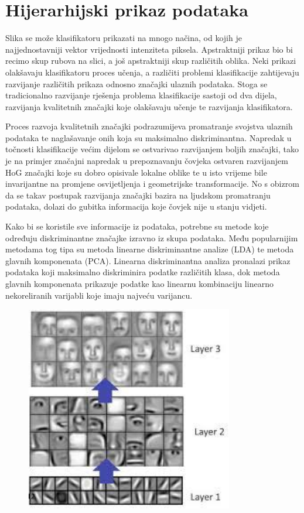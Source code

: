 \documentclass[lmodern, utf8, diplomski, numeric]{fer}
\begin{document}
\section{Hijerarhijski prikaz podataka}

Slika se može klasifikatoru prikazati na mnogo načina, od kojih je najjednostavniji vektor vrijednosti intenziteta piksela. Apstraktniji prikaz bio bi recimo skup rubova na slici, a još apstraktniji skup različitih oblika. Neki prikazi olakšavaju klasifikatoru proces učenja, a različiti problemi klasifikacije zahtijevaju razvijanje različitih prikaza odnosno značajki ulaznih podataka. Stoga  se tradicionalno razvijanje rješenja problema klasifikacije sastoji od dva dijela, razvijanja kvalitetnih značajki koje olakšavaju učenje te razvijanja klasifikatora. 

Proces razvoja kvalitetnih značajki podrazumijeva promatranje svojstva ulaznih podataka te naglašavanje onih koja su maksimalno diskriminantna. Napredak u točnosti klasifikacije većim dijelom se ostvarivao razvijanjem boljih značajki, tako je na primjer značajni napredak u prepoznavanju čovjeka ostvaren razvijanjem HoG značajki koje su dobro opisivale lokalne oblike te u isto vrijeme bile invarijantne na  promjene osvijetljenja i geometrijske transformacije. No s obizrom da se takav postupak razvijanja značajki bazira na ljudskom promatranju podataka, dolazi do gubitka informacija koje čovjek nije u stanju vidjeti. 

Kako bi se koristile sve informacije iz podataka, potrebne su metode koje određuju diskriminantne značajke izravno iz skupa podataka. Među popularnijim metodama tog tipa su metoda linearne diskriminantne analize (LDA) te metoda glavnih komponenata (PCA). Linearna diskriminantna analiza pronalazi prikaz podataka koji maksimalno diskriminira podatke različitih klasa, dok metoda glavnih komponenata prikazuje podatke kao linearnu kombinaciju linearno nekoreliranih varijabli koje imaju najveću varijancu.

\begin{figure}[ht!]
\centering
\includegraphics[height=9cm]{slike/feature_hierarchy2.jpeg}
\caption{}
\end{figure}
\end{document}
